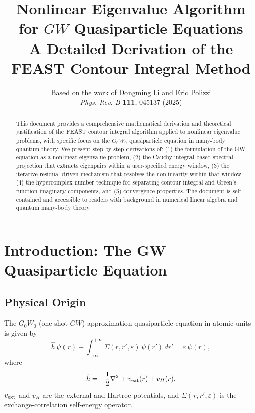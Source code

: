 \documentclass[12pt,a4paper]{article}
\title{\bfseries Nonlinear Eigenvalue Algorithm for $GW$ Quasiparticle Equations\\
\large A Detailed Derivation of the FEAST Contour Integral Method}
\author{Based on the work of Dongming Li and Eric Polizzi\\
\textit{Phys. Rev. B} \textbf{111}, 045137 (2025)}
\date{}
\theoremstyle{definition}
\begin{document}
\maketitle

\begin{abstract}
This document provides a comprehensive mathematical derivation and theoretical justification of the FEAST contour integral algorithm applied to nonlinear eigenvalue problems, with specific focus on the $G_0W_0$ quasiparticle equation in many-body quantum theory. We present step-by-step derivations of: (1) the formulation of the GW equation as a nonlinear eigenvalue problem, (2) the Cauchy-integral-based spectral projection that extracts eigenpairs within a user-specified energy window, (3) the iterative residual-driven mechanism that resolves the nonlinearity within that window, (4) the hypercomplex number technique for separating contour-integral and Green's-function imaginary components, and (5) convergence properties. The document is self-contained and accessible to readers with background in numerical linear algebra and quantum many-body theory.
\end{abstract}

\tableofcontents

\section{Introduction: The GW Quasiparticle Equation}

\subsection{Physical Origin}

The $G_0W_0$ (one-shot $GW$) approximation quasiparticle equation in atomic units is given by
\begin{equation}\label{eq:gw_qp}
\hat{h}\,\psi(r) + \int_{-\infty}^{+\infty} \Sigma(r, r', \varepsilon)\,\psi(r')\,dr' = \varepsilon\,\psi(r),
\end{equation}
where
\begin{equation}\label{eq:h_hat}
\hat{h} = -\frac{1}{2}\nabla^{2} + v_{\rm ext}(r) + v_{H}(r),
\end{equation}
$v_{\rm ext}$ and $v_{H}$ are the external and Hartree potentials, and $\Sigma(r,r',\varepsilon)$ is the exchange-correlation self-energy operator.
\end{document}
